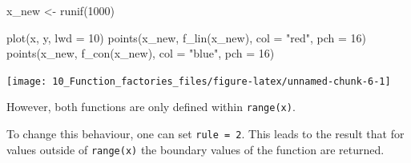 \documentclass[
]{krantz}
\makeatletter
\newenvironment{Shaded}{\begin{snugshade}}{\end{snugshade}}
\newcommand{\CommentTok}[1]{\textcolor[rgb]{0.56,0.35,0.01}{\textit{#1}}}
\newcommand{\DataTypeTok}[1]{\textcolor[rgb]{0.13,0.29,0.53}{#1}}
\newcommand{\DecValTok}[1]{\textcolor[rgb]{0.00,0.00,0.81}{#1}}
\newcommand{\KeywordTok}[1]{\textcolor[rgb]{0.13,0.29,0.53}{\textbf{#1}}}
\newcommand{\NormalTok}[1]{#1}
\newcommand{\OperatorTok}[1]{\textcolor[rgb]{0.81,0.36,0.00}{\textbf{#1}}}
\newcommand{\StringTok}[1]{\textcolor[rgb]{0.31,0.60,0.02}{#1}}
\newenvironment{kframe}{%
\medskip{}
\setlength{\fboxsep}{.8em}
 \def\at@end@of@kframe{}%
 \ifinner\ifhmode%
  \def\at@end@of@kframe{\end{minipage}}%
  \begin{minipage}{\columnwidth}%
 \fi\fi%
 \def\FrameCommand##1{\hskip\@totalleftmargin \hskip-\fboxsep
 \colorbox{shadecolor}{##1}\hskip-\fboxsep
     \hskip-\linewidth \hskip-\@totalleftmargin \hskip\columnwidth}%
 \MakeFramed {\advance\hsize-\width
   \@totalleftmargin\z@ \linewidth\hsize
   \@setminipage}}%
 {\par\unskip\endMakeFramed%
 \at@end@of@kframe}
\renewenvironment{Shaded}{\begin{kframe}}{\end{kframe}}
\renewcommand{\KeywordTok} [1]{\textcolor[rgb]{0.00,0.44,0.13}{{#1}}}
\renewcommand{\DataTypeTok}[1]{\textcolor[rgb]{0.56,0.13,0.00}{{#1}}}
\renewcommand{\DecValTok}  [1]{\textcolor[rgb]{0.25,0.63,0.44}{{#1}}}
\renewcommand{\StringTok}  [1]{\textcolor[rgb]{0.25,0.44,0.63}{{#1}}}
\renewcommand{\CommentTok} [1]{\textcolor[rgb]{0.38,0.63,0.69}{{#1}}}
\renewcommand{\NormalTok}  [1]{{#1}}
\makeatother
\begin{document}
\begin{Shaded}
\begin{Highlighting}[]
\NormalTok{x_new <-}\StringTok{ }\KeywordTok{runif}\NormalTok{(}\DecValTok{1000}\NormalTok{)}

\KeywordTok{plot}\NormalTok{(x, y, }\DataTypeTok{lwd =} \DecValTok{10}\NormalTok{)}
\KeywordTok{points}\NormalTok{(x_new, }\KeywordTok{f_lin}\NormalTok{(x_new), }\DataTypeTok{col =} \StringTok{"red"}\NormalTok{, }\DataTypeTok{pch =} \DecValTok{16}\NormalTok{)}
\KeywordTok{points}\NormalTok{(x_new, }\KeywordTok{f_con}\NormalTok{(x_new), }\DataTypeTok{col =} \StringTok{"blue"}\NormalTok{, }\DataTypeTok{pch =} \DecValTok{16}\NormalTok{)}
\end{Highlighting}
\end{Shaded}

\begin{center}\texttt{[image: 10\_Function\_factories\_files/figure-latex/unnamed-chunk-6-1]} \end{center}

However, both functions are only defined within \texttt{range(x)}.

\begin{Shaded}
\end{Shaded}

To change this behaviour, one can set \texttt{rule\ =\ 2}. This leads to the result that for values outside of \texttt{range(x)} the boundary values of the function are returned.
\end{document}
